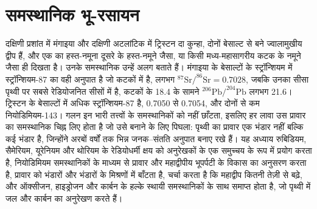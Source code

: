 \chapter{समस्थानिक भू-रसायन}\label{ch:b2:isotope-geochemistry}

दक्षिणी प्रशांत में मंगाइया और दक्षिणी अटलांटिक में ट्रिस्टन दा कुन्हा,
दोनों बेसाल्ट से बने ज्वालामुखीय द्वीप हैं, और एक का हस्त-नमूना
दूसरे के हस्त-नमूने जैसा, या किसी मध्य-महासागरीय कटक के नमूने जैसा ही दिखता है।
उनके समस्थानिक उन्हें अलग बताते हैं। मंगाइया के बेसाल्टों के स्ट्रॉन्शियम में
स्ट्रॉन्शियम-87 का वही अनुपात है जो कटकों में है, लगभग
$^{87}\mathrm{Sr}/^{86}\mathrm{Sr} = 0.7028$, जबकि उनका सीसा पृथ्वी पर सबसे
रेडियोजनित सीसों में है, कटकों के 18.4 के सामने $^{206}\mathrm{Pb}/^{204}\mathrm{Pb}$
लगभग 21.6। ट्रिस्टन के बेसाल्टों में अधिक स्ट्रॉन्शियम-87 है, 0.7050 से
0.7054, और दोनों से कम नियोडिमियम-143। गलन इन भारी तत्त्वों के समस्थानिकों को
नहीं छाँटता, इसलिए हर लावा उस प्रावार का समस्थानिक चिह्न लिए होता है
जो उसे बनाने के लिए पिघला: पृथ्वी का प्रावार एक भंडार नहीं बल्कि
कई भंडार है, जिन्होंने अरबों वर्षों तक भिन्न जनक--संतति अनुपात बनाए
रखे हैं। यह अध्याय रुबिडियम, सैमेरियम, यूरेनियम
और थोरियम के रेडियोधर्मी क्षय को अनुरेखकों के एक समुच्चय के रूप में प्रयोग करता है, नियोडिमियम समस्थानिकों के माध्यम से प्रावार और
महाद्वीपीय भूपर्पटी के विकास का अनुसरण करता है, प्रावार को
भंडारों और भंडारों के मिश्रणों में बाँटता है, चर्चा करता है कि महाद्वीप कितनी तेज़ी से बढ़े,
और ऑक्सीजन, हाइड्रोजन और कार्बन के हल्के स्थायी समस्थानिकों के साथ समाप्त होता है, जो
पृथ्वी में जल और कार्बन का अनुरेखण करते हैं।

